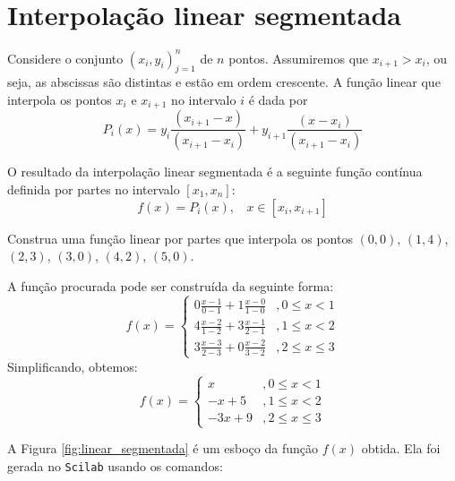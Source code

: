 \section{Interpolação linear segmentada}
Considere o conjunto $\left(x_i,y_i\right)_{j=1}^n$ de $n$ pontos. Assumiremos que $x_{i+1}>x_i$, ou seja, as abscissas são distintas e estão em ordem crescente. A função linear que interpola os pontos $x_i$ e $x_{i+1}$ no intervalo $i$ é dada por
$$P_i(x)=y_i \frac{(x_{i+1}-x)}{(x_{i+1}-x_i)} + y_{i+1} \frac{(x-x_i)}{(x_{i+1}-x_i)}$$

O resultado da interpolação linear segmentada é a seguinte função contínua definida por partes no intervalo $[x_1,x_n]$:
$$f(x)=P_i(x), ~~~~ x\in [x_i,x_{i+1}]$$

\begin{ex}
  Construa uma função linear por partes que interpola os pontos $(0,0)$, $(1,4)$, $(2,3)$, $(3,0)$, $(4,2)$, $(5,0)$.

A função procurada pode ser construída da seguinte forma:
\begin{equation*}
  f(x) = \left\{
    \begin{array}{ll}
      0\frac{x-1}{0-1} + 1\frac{x-0}{1-0} &, 0 \leq x < 1\\
      4\frac{x-2}{1-2} + 3\frac{x-1}{2-1} &, 1\leq x < 2\\
      3\frac{x-3}{2-3} + 0\frac{x-2}{3-2} &, 2\leq x \leq 3
    \end{array}
\right.
\end{equation*}
Simplificando, obtemos:
\begin{equation*}
  f(x) = \left\{
    \begin{array}{ll}
      x &, 0 \leq x < 1\\
      -x + 5 &, 1\leq x < 2\\
      -3x + 9 &, 2\leq x \leq 3
    \end{array}
\right.  
\end{equation*}
\end{ex}

A Figura \ref{fig:linear_segmentada} é um esboço da função $f(x)$ obtida. 
\ifisscilab
Ela foi gerada no \verb+Scilab+ usando os comandos:

\fi

